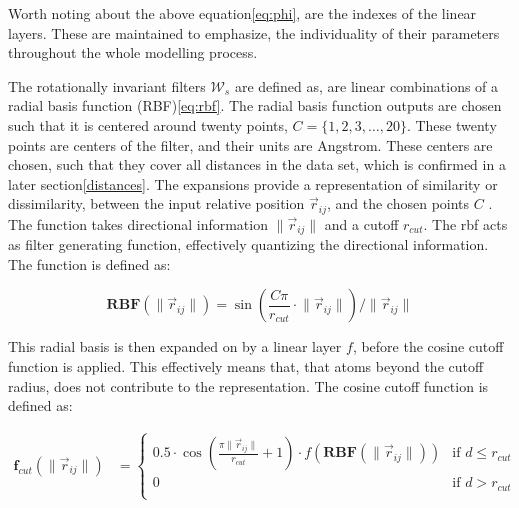 Worth noting about the above equation\ref{eq:phi}, are the indexes of the linear layers. These are maintained to emphasize,
the individuality of their parameters throughout the whole modelling process.

The rotationally invariant filters $\mathcal{W}_{s}$ are defined as, are linear combinations of a radial basis function
(RBF)\ref{eq:rbf}\cite{Atz2021}. The radial basis function outputs are chosen such that it is centered around twenty
points, $ C = \{1, 2, 3, \ldots, 20\}$. These twenty points are centers of the filter, and their units are Angstrom.
These centers are chosen, such that they cover all distances in the data set, which is confirmed in a later section\ref{distances}.
The expansions provide a representation of similarity or dissimilarity, between the input relative position $\vec{r}_{ij}$,
and the chosen points $C$ \cite{rbf}.
The function takes directional information $\lVert \vec{r}_{ij} \rVert$ and a cutoff
$r_{cut}$. The rbf acts as filter generating function\cite{Schütt2017},
effectively quantizing the directional information. The function is defined as:

\begin{equation}\label{eq:rbf}
    \mathbf{RBF}(\lVert \vec{r}_{ij} \rVert) = \sin \left( \frac{C \pi}{r_{cut}} \cdot \lVert \vec{r}_{ij} \rVert  \right) / \lVert \vec{r}_{ij} \rVert
\end{equation}

This radial basis is then expanded on by a linear layer $f$, before the cosine cutoff function is applied. This effectively means that,
that atoms beyond the cutoff radius, does not contribute to the representation\cite{Behler2011}. The cosine cutoff function
is defined as:

\begin{equation}\label{eq:coscutoffproject}
    \begin{aligned}
        \mathbf{f}_{cut}(\lVert \vec{r}_{ij} \rVert) & =
        \begin{cases}
            0.5 \cdot \cos \left( \frac{\pi \lVert \vec{r}_{ij} \rVert}{r_{cut}} + 1  \right) \cdot f(\mathbf{RBF}(\lVert \vec{r}_{ij} \rVert)) & \text{if } d \leq r_{cut} \\
            0                                                                                                                                   & \text{if } d > r_{cut}    \\
        \end{cases}
    \end{aligned}
\end{equation}

